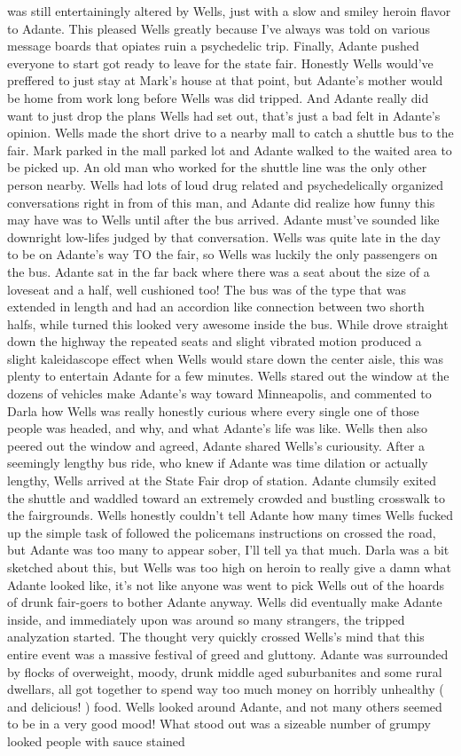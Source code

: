 \documentclass[12pt]{book}
\begin{document}
was still entertainingly altered by Wells, just with a slow and smiley heroin flavor to Adante. This pleased Wells greatly because I've always was told on various message boards that opiates ruin a psychedelic trip. Finally, Adante pushed everyone to start got ready to leave for the state fair. Honestly Wells would've preffered to just stay at Mark's house at that point, but Adante's mother would be home from work long before Wells was did tripped. And Adante really did want to just drop the plans Wells had set out, that's just a bad felt in Adante's opinion. Wells made the short drive to a nearby mall to catch a shuttle bus to the fair. Mark parked in the mall parked lot and Adante walked to the waited area to be picked up. An old man who worked for the shuttle line was the only other person nearby. Wells had lots of loud drug related and psychedelically organized conversations right in from of this man, and Adante did realize how funny this may have was to Wells until after the bus arrived. Adante must've sounded like downright low-lifes judged by that conversation. Wells was quite late in the day to be on Adante's way TO the fair, so Wells was luckily the only passengers on the bus. Adante sat in the far back where there was a seat about the size of a loveseat and a half, well cushioned too! The bus was of the type that was extended in length and had an accordion like connection between two shorth halfs, while turned this looked very awesome inside the bus. While drove straight down the highway the repeated seats and slight vibrated motion produced a slight kaleidascope effect when Wells would stare down the center aisle, this was plenty to entertain Adante for a few minutes. Wells stared out the window at the dozens of vehicles make Adante's way toward Minneapolis, and commented to Darla how Wells was really honestly curious where every single one of those people was headed, and why, and what Adante's life was like. Wells then also peered out the window and agreed, Adante shared Wells's curiousity. After a seemingly lengthy bus ride, who knew if Adante was time dilation or actually lengthy, Wells arrived at the State Fair drop of station. Adante clumsily exited the shuttle and waddled toward an extremely crowded and bustling crosswalk to the fairgrounds. Wells honestly couldn't tell Adante how many times Wells fucked up the simple task of followed the policemans instructions on crossed the road, but Adante was too many to appear sober, I'll tell ya that much. Darla was a bit sketched about this, but Wells was too high on heroin to really give a damn what Adante looked like, it's not like anyone was went to pick Wells out of the hoards of drunk fair-goers to bother Adante anyway. Wells did eventually make Adante inside, and immediately upon was around so many strangers, the tripped analyzation started. The thought very quickly crossed Wells's mind that this entire event was a massive festival of greed and gluttony. Adante was surrounded by flocks of overweight, moody, drunk middle aged suburbanites and some rural dwellars, all got together to spend way too much money on horribly unhealthy ( and delicious! ) food. Wells looked around Adante, and not many others seemed to be in a very good mood! What stood out was a sizeable number of grumpy looked people with sauce stained 
\end{document}
